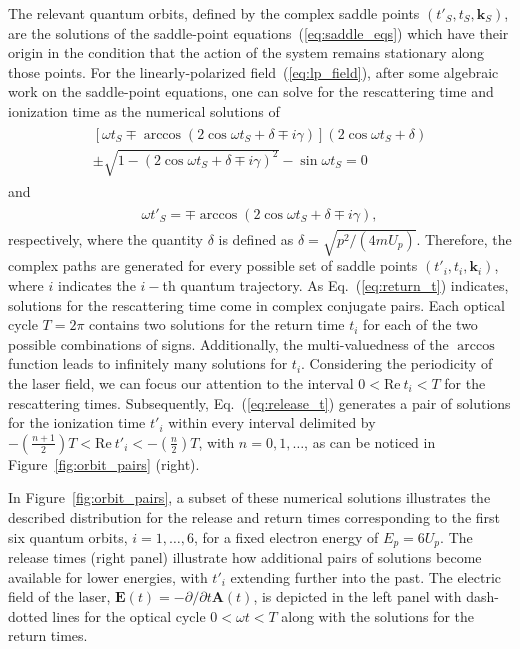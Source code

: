 The relevant quantum orbits, defined by the complex saddle points
$(t'_{S}, t_{S}, \mathbf{k}_{S})$, are the solutions of the
saddle-point equations~(\ref{eq:saddle_eqs}) which have their origin
in the condition that the action of the system remains stationary
along those points. For the linearly-polarized
field~(\ref{eq:lp_field}), after some algebraic work on the
saddle-point equations, one can solve for the rescattering time and
ionization time as the numerical solutions of~\cite{KopoldOptComm2000}
%
\begin{eqnarray}
  \label{eq:return_t}
  \begin{split}
    [\omega t_{S} \mp \arccos(2\cos\omega t_{S} + \delta \mp i\gamma)]
    (2\cos\omega t_{S} + \delta) \\
    \pm \sqrt{1 - (2\cos\omega t_{S} + \delta \mp i\gamma)^{2}} 
    - \sin\omega t_{S} = 0
  \end{split}
\end{eqnarray}
%
and
%
\begin{eqnarray}
  \label{eq:release_t}
  \begin{split}
    \omega t'_{S} = \mp \arccos(2\cos\omega t_{S} + \delta \mp i\gamma),
  \end{split}
\end{eqnarray}  
%
respectively, where the quantity $\delta$ is defined as $\delta =
\sqrt{p^{2} / (4mU_{p})}$. Therefore, the complex paths are generated
for every possible set of saddle points $(t'_{i}, t_{i},
\mathbf{k}_{i})$, where $i$ indicates the $i-$th quantum
trajectory. As Eq.~(\ref{eq:return_t}) indicates, solutions for the
rescattering time come in complex conjugate pairs. Each optical cycle
$T = 2\pi$ contains two solutions for the return time $t_{i}$ for each
of the two possible combinations of signs. Additionally, the
multi-valuedness of the $\arccos$ function leads to infinitely many
solutions for $t_{i}$. Considering the periodicity of the laser field,
we can focus our attention to the interval $0 < \mathrm{Re}\ t_{i} <
T$ for the rescattering times. Subsequently, Eq.~(\ref{eq:release_t})
generates a pair of solutions for the ionization time $t'_{i}$ within
every interval delimited by $-(\frac{n+1}{2}) T < \mathrm{Re}\ t'_{i}
< -(\frac{n}{2})T$, with $n = 0,1,\dots$, as can be noticed in
Figure~\ref{fig:orbit_pairs} (right).

In Figure~\ref{fig:orbit_pairs}, a subset of these numerical solutions
illustrates the described distribution for the release and return
times corresponding to the first six quantum orbits, $i = 1, \dots,
6$, for a fixed electron energy of $E_{p} = 6 U_{p}$.  The release
times (right panel) illustrate how additional pairs of solutions
become available for lower energies, with $t'_{i}$ extending further
into the past. The electric field of the laser, $\mathbf{E}(t) =
-\partial/\partial t \mathbf{A}(t)$, is depicted in the left panel
with dash-dotted lines for the optical cycle $0 < \omega t < T$ along
with the solutions for the return times.

